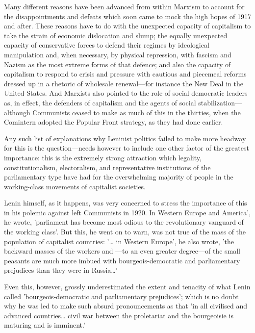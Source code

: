 Many different reasons have been advanced from within Marxism to account for the disappointments and defeats which soon came to mock the high hopes of 1917 and after. These reasons have to do with the unexpected capacity of capitalism to take the strain of economic dislocation and slump; the equally unexpected capacity of conservative forces to defend their regimes by ideological manipulation and, when necessary, by physical repression, with fascism and Nazism as the most extreme forms of that defence; and also the capacity of capitalism to respond to crisis and pressure with cautious and piecemeal reforms dressed up in a rhetoric of wholesale renewal—for instance the New Deal in the United States. And Marxists also pointed to the role of social democratic leaders as, in effect, the defenders of capitalism and the agents of social stabilization—although Communists ceased to make as much of this in the thirties, when the Comintern adopted the Popular Front strategy, as they had done earlier.

Any such list of explanations why Leninist politics failed to make more headway for this is the question—needs however to include one other factor of the greatest importance: this is the extremely strong attraction which legality, constitutionalism, electoralism, and representative institutions of the parliamentary type have had for the overwhelming majority of people in the working-class movements of capitalist societies.

Lenin himself, as it happens, was very concerned to stress the importance of this in his polemic against left Communists in 1920. In Western Europe and America', he wrote, 'parliament has become most odious to the revolutionary vanguard of the working class'. But this, he went on to warn, was not true of the mass of the population of capitalist countries: '\dots{} in Western Europe', he also wrote, 'the backward masses of the workers and —to an even greater degree—of the small peasants are much more imbued with bourgeois-democratic and parliamentary prejudices than they were in Russia\dots{}'

Even this, however, grossly underestimated the extent and tenacity of what Lenin called 'bourgeois\hyp{}democratic and parliamentary prejudices'; which is no doubt why he was led to make such absurd pronouncements as that 'in all civilised and advanced countries\dots{} civil war between the proletariat and the bourgeoisie is maturing and is imminent.'

